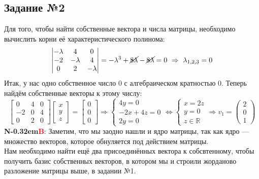 \documentclass[a3paper,14pt]{extarticle}
\newcommand\NB{\textbf{N\kern-0.32em\textcolor{red}{B}}}
\begin{document}
\subsection*{\centering Задание №2}
Для того, чтобы найти собственные вектора и числа матрицы, необходимо вычислить корни её характеристического полинома:
$$\begin{vmatrix}
    -\lambda & 4 & 0 \\ -2 & -\lambda & 4 \\ 0 & 2 & -\lambda
\end{vmatrix} = -\lambda^3 + \cancel{8\lambda} - \cancel{8\lambda} = 0 \ \Rightarrow\ \lambda_{1,2,3} = 0$$
Итак, у нас одно собственное число $0$ с алгебраическом кратностью $0$. Теперь найдём собственные векторы к этому числу:
$$\begin{bmatrix}
    0 & 4 & 0 \\ -2 & 0 & 4 \\ 0 & 2 & 0
\end{bmatrix}\begin{bmatrix}
    x \\ y \\ z
\end{bmatrix} = \begin{bmatrix}
    0 \\ 0 \\ 0
\end{bmatrix} \Rightarrow \begin{cases}
    4y = 0 \\
    -2x + 4z = 0 \\
    2y = 0
\end{cases} \Leftrightarrow \begin{cases}
    x = 2z \\
    y = 0 \\
    z \in \mathbb{R}
\end{cases} \Rightarrow v_1 = \begin{pmatrix}
    2 \\ 0 \\ 1
\end{pmatrix}$$
\NB: Заметим, что мы заодно нашли и ядро матрицы, так как ядро --- множество векторов, которое обнуляется под действием матрицы.\\
Нам необходимо найти ещё два присоединённых вектора к собсвтенному, чтобы получить базис собственных векторов, в котором мы и строили жорданово разложение матрицы выше, в задании №1.
\end{document}

